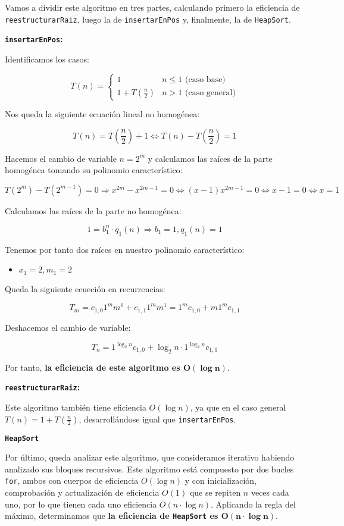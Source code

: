 Vamos a dividir este algoritmo en tres partes, calculando primero la eficiencia de \texttt{reestructurarRaiz}, luego la de \texttt{insertarEnPos} y, finalmente, la de \texttt{HeapSort}.

\textbf{\texttt{insertarEnPos}:}

Identificamos los casos:

\[T(n)=
\begin{cases}
	1                & n\leq1\text{ (caso base)} \\
	1+T(\frac{n}{2}) & n>1\text{ (caso general)}
\end{cases}
\]

Nos queda la siguiente ecuación lineal no homogénea:

\[T(n)=T(\frac{n}{2})+1\Leftrightarrow T(n)-T(\frac{n}{2})=1\]

Hacemos el cambio de variable $n=2^m$ y calculamos las raíces de la parte homogénea tomando su polinomio característico:

\[T(2^m)-T(2^{m-1})=0\Rightarrow x^{2m}-x^{2m-1}=0\Leftrightarrow(x-1)x^{2m-1}=0\Leftrightarrow x-1=0\Leftrightarrow x=1\]

Calculamos las raíces de la parte no homogénea:

\[1=b_1^n\cdot q_1(n)\Rightarrow b_1=1,q_1(n)=1\]

Tenemos por tanto dos raíces en nuestro polinomio característico:

\begin{itemize}
	\item $x_1=2, m_1=2$
\end{itemize}

Queda la siguiente ecueción en recurrencias:

\[T_m=c_{1,0}1^m m^0+c_{1,1}1^m m^1=1^m c_{1,0}+m1^m c_{1,1}\]

Deshacemos el cambio de variable:

\[T_n=1^{\log_2n}c_{1,0}+\log_2n\cdot1^{\log_2n}c_{1,1}\]

Por tanto, \textbf{la eficiencia de este algoritmo es $\boldsymbol{O(\log n)}$}.

\textbf{\texttt{reestructurarRaiz}:}

Este algoritmo también tiene eficiencia $O(\log n)$, ya que en el caso general $T(n)=1+T(\frac{n}{2})$, desarrollándose igual que \texttt{insertarEnPos}.

\textbf{\texttt{HeapSort}}

Por último, queda analizar este algoritmo, que consideramos iterativo habiendo analizado sus bloques recursivos.
Este algoritmo está compuesto por dos bucles \texttt{for}, ambos con cuerpos de eficiencia $O(\log n)$ y con inicialización, comprobación y actualización de eficiencia $O(1)$ que se repiten $n$ veces cada uno, por lo que tienen cada uno eficiencia $O(n\cdot\log n)$.
Aplicando la regla del máximo, determinamos que \textbf{la eficiencia de \texttt{HeapSort} es $\boldsymbol{O(n\cdot\log n)}$}.

